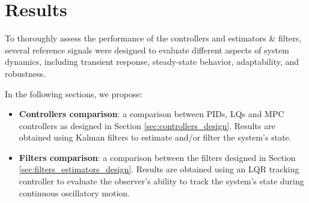 \section{Results}
\label{sec:results}

To thoroughly assess the performance of the controllers and estimators \& filters, several reference signals were designed to evaluate different aspects of system dynamics, including transient response, steady-state behavior, adaptability, and robustness.

In the following sections, we propose:

\begin{itemize}
    \item \textbf{Controllers comparison}: a comparison between PIDs, LQs and MPC controllers as designed in Section \ref{sec:controllers_design}. Results are obtained using Kalman filters to estimate and/or filter the system's state.
    \item \textbf{Filters comparison}: a comparison between the filters designed in Section \ref{sec:filters_estimators_design}. Results are obtained using an LQR tracking controller to evaluate the observer's ability to track the system's state during continuous oscillatory motion.
\end{itemize}





